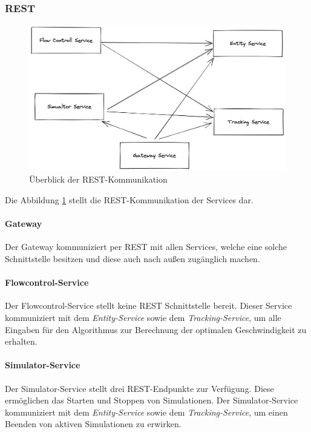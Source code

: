 \subsubsection{REST}

\begin{figure}[h]
	\centering
	\includegraphics[width=1.02\textwidth]{./figures/rest_communication.png}
	\caption{Überblick der REST-Kommunikation}
	\label{fig:kom_rest_overview}
\end{figure}

Die Abbildung \ref{fig:kom_rest_overview} stellt die REST-Kommunikation der Services dar. 

\paragraph{Gateway}

Der Gateway kommuniziert per REST mit allen Services, welche eine solche Schnittstelle besitzen und diese auch nach außen zugänglich machen.

\paragraph{Flowcontrol-Service}

Der Flowcontrol-Service stellt keine REST Schnittstelle bereit.
Dieser Service kommuniziert mit dem \textit{Entity-Service} sowie dem \textit{Tracking-Service}, um alle Eingaben für den Algorithmus zur Berechnung der optimalen Geschwindigkeit zu erhalten.

\paragraph{Simulator-Service}
Der Simulator-Service stellt drei REST-Endpunkte zur Verfügung.
Diese ermöglichen das Starten und Stoppen von Simulationen.
Der Simulator-Service kommuniziert mit dem \textit{Entity-Service} sowie dem \textit{Tracking-Service}, um einen Beenden von aktiven Simulationen zu erwirken.

